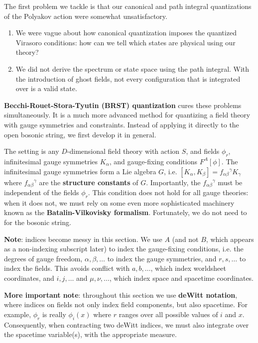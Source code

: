 \documentclass{report}
\theoremstyle{plain}
\theoremstyle{definition}
\theoremstyle{remark}
\begin{document}
The first problem we tackle is that our canonical and path integral
quantizations of the Polyakov action were somewhat unsatisfactory.
\begin{enumerate}
\item We were vague about how canonical quantization imposes the
  quantized Virasoro conditions: how can we tell which states are
  physical using our theory?
\item We did not derive the spectrum or state space using the path
  integral. With the introduction of ghost fields, not every
  configuration that is integrated over is a valid state.
\end{enumerate}
{\bf Becchi-Rouet-Stora-Tyutin (BRST) quantization} cures these
problems simultaneously. It is a much more advanced method for
quantizing a field theory with gauge symmetries and constraints.
Instead of applying it directly to the open bosonic string, we first
develop it in general.

The setting is any $D$-dimensional field theory with action $S$, and
fields $\phi_r$, infinitesimal gauge symmetries $K_\alpha$, and
gauge-fixing conditions $F^A[\phi]$. The infinitesimal gauge
symmetries form a Lie algebra $G$, i.e. $[K_\alpha, K_\beta] =
f_{\alpha\beta}{}^\gamma K_\gamma$ where $f_{\alpha\beta}{}^\gamma$
are the {\bf structure constants} of $G$. Importantly, the
$f_{\alpha\beta}{}^\gamma$ must be independent of the fields $\phi_r$.
This condition does not hold for all gauge theories: when it does not,
we must rely on some even more sophisticated machinery known as the
{\bf Batalin-Vilkovisky formalism}. Fortunately, we do not need to for
the bosonic string.

{\bf Note}: indices become messy in this section. We use $A$ (and not
$B$, which appears as a non-indexing subscript later) to index the
gauge-fixing conditions, i.e. the degrees of gauge freedom, $\alpha,
\beta, \ldots$ to index the gauge symmetries, and $r, s, \ldots$ to
index the fields. This avoids conflict with $a, b, \ldots$, which
index worldsheet coordinates, and $i, j, \ldots$ and $\mu, \nu,
\ldots$, which index space and spacetime coordinates.

{\bf More important note}: throughout this section we use {\bf deWitt
  notation}, where indices on fields not only index field components,
but also spacetime. For example, $\phi_r$ is really $\phi_i(x)$ where
$r$ ranges over all possible values of $i$ and $x$. Consequently, when
contracting two deWitt indices, we must also integrate over the
spacetime variable(s), with the appropriate measure.
\end{document}
